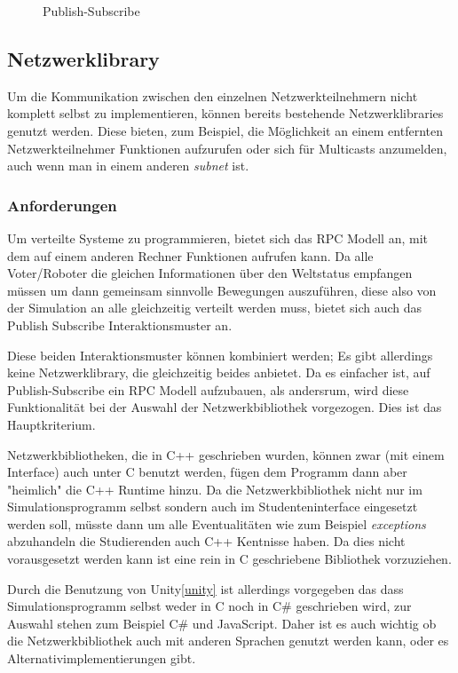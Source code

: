 \begin{figure}
	\centering
	\caption{Publish-Subscribe}
	\label{fig:pubsub}
\end{figure}

\subsection{Netzwerklibrary}
Um die Kommunikation zwischen den einzelnen Netzwerkteilnehmern nicht komplett selbst zu implementieren, k{\"{o}}nnen bereits bestehende Netzwerklibraries genutzt werden.
Diese bieten, zum Beispiel, die M{\"{o}}glichkeit an einem entfernten Netzwerkteilnehmer Funktionen aufzurufen oder sich f{\"{u}}r Multicasts anzumelden, auch wenn man in einem anderen
\textit{subnet} ist.

\subsubsection{Anforderungen}
Um verteilte Systeme zu programmieren, bietet sich das RPC Modell an, mit dem auf einem anderen Rechner Funktionen 
aufrufen kann. Da alle Voter/Roboter die gleichen Informationen {\"{u}}ber den Weltstatus empfangen m{\"{u}}ssen um
dann gemeinsam sinnvolle Bewegungen auszuf{\"{u}}hren, diese also von der Simulation an alle gleichzeitig verteilt werden
muss, bietet sich auch das Publish Subscribe Interaktionsmuster an.

Diese beiden Interaktionsmuster k{\"{o}}nnen kombiniert werden; Es gibt allerdings keine Netzwerklibrary, die gleichzeitig beides anbietet.
Da es einfacher ist, auf Publish-Subscribe ein RPC Modell aufzubauen, als andersrum, wird diese Funktionalit{\"{a}}t bei der Auswahl der
Netzwerkbibliothek vorgezogen. Dies ist das Hauptkriterium.

Netzwerkbibliotheken, die in C++ geschrieben wurden, k{\"{o}}nnen zwar (mit einem Interface) auch unter C benutzt 
werden, f{\"{u}}gen dem Programm dann aber "heimlich" die C++ Runtime hinzu. Da die Netzwerkbibliothek nicht
nur im Simulationsprogramm selbst sondern auch im Studenteninterface eingesetzt werden soll, m{\"{u}}sste dann
um alle Eventualit{\"{a}}ten wie zum Beispiel \textit{exceptions} abzuhandeln die Studierenden auch C++
Kentnisse haben. Da dies nicht vorausgesetzt werden kann ist eine rein in C geschriebene Bibliothek vorzuziehen.

Durch die Benutzung von Unity\ref{unity} ist allerdings vorgegeben das dass Simulationsprogramm selbst weder in C noch
in C\# geschrieben wird, zur Auswahl stehen zum Beispiel C\# und JavaScript. Daher ist es auch wichtig ob die Netzwerkbibliothek
auch mit anderen Sprachen genutzt werden kann, oder es Alternativimplementierungen gibt.

